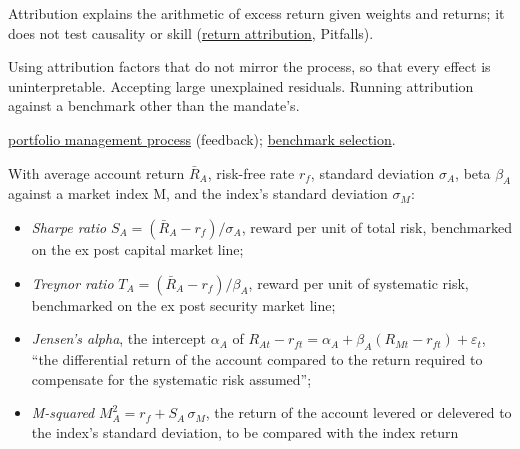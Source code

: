 \begin{qfdefinition}
 Attribution explains the arithmetic of excess return given weights and returns; it does not test causality or skill (\hyperref[meth:return-attribution]{return attribution}, Pitfalls).

 Using attribution factors that do not mirror the process, so that every effect is uninterpretable. Accepting large unexplained residuals. Running attribution against a benchmark other than the mandate's.

 \hyperref[def:portfolio-management-process]{portfolio management process} (feedback); \hyperref[meth:benchmark-selection-quality]{benchmark selection}.

\end{qfdefinition}

\begin{qfmethod}\label{meth:risk-adjusted-performance-measures}
 With average account return $\bar R_A$, risk-free rate $r_f$, standard deviation $\sigma_A$, beta $\beta_A$ against a market index M, and the index's standard deviation $\sigma_M$:
\begin{itemize}
\item \emph{Sharpe ratio} $S_A=(\bar R_A-r_f)/\sigma_A$, reward per unit of total risk, benchmarked on the ex post capital market line;
\item \emph{Treynor ratio} $T_A=(\bar R_A-r_f)/\beta_A$, reward per unit of systematic risk, benchmarked on the ex post security market line;
\item \emph{Jensen's alpha}, the intercept $\alpha_A$ of $R_{At}-r_{ft}=\alpha_A+\beta_A(R_{Mt}-r_{ft})+\varepsilon_t$, ``the differential return of the account compared to the return required to compensate for the systematic risk assumed'';
\item \emph{M-squared} $M_A^2=r_f+S_A\,\sigma_M$, the return of the account levered or delevered to the index's standard deviation, to be compared with the index return
\end{itemize}

\end{qfmethod}

